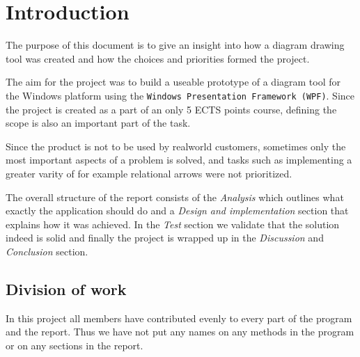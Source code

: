 \section{Introduction}
The purpose of this document is to give an insight into how a diagram drawing
tool was created and how the choices and priorities formed the project. 

The aim for the project was to build a useable prototype of a diagram tool for 
the Windows
platform using the \texttt{Windows Presentation Framework (WPF)}. Since the project is
created as a part of an only 5 ECTS points course, defining the scope is also an
important part of the task.

Since the product is not to be used by realworld customers, sometimes only the
most important aspects of a problem is solved, and tasks such as implementing a
greater varity of for
example relational arrows were not prioritized.

The overall structure of the report consists of the
\textit{Analysis} which outlines what exactly the application should do and a
\textit{Design and implementation} section that explains how it was achieved. In the \textit{Test} section
we validate that the solution indeed is solid and finally the project is wrapped
up in the \textit{Discussion} and \textit{Conclusion} section.

\subsection{Division of work}
In this project all members have contributed evenly to every part of the 
program and the report. Thus we have not put any names on any methods in the 
program or on any sections in the report.
